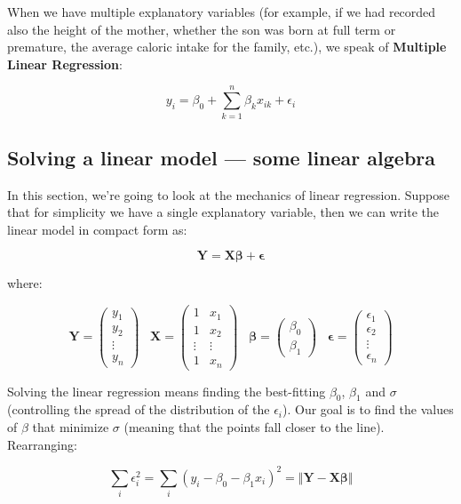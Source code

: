 \documentclass[
  letterpaper,
  DIV=11,
  numbers=noendperiod]{scrreprt}
\begin{document}
When we have multiple explanatory variables (for example, if we had
recorded also the height of the mother, whether the son was born at full
term or premature, the average caloric intake for the family, etc.), we
speak of \textbf{Multiple Linear Regression}:

\[
y_i = \beta_0 + \sum_{k=1}^n \beta_k x_{ik} + \epsilon_i
\]

\subsection{Solving a linear model --- some linear
algebra}\label{solving-a-linear-model-some-linear-algebra}

In this section, we're going to look at the mechanics of linear
regression. Suppose that for simplicity we have a single explanatory
variable, then we can write the linear model in compact form as:

\[
\mathbf{Y} = \mathbf{X} \mathbf{\beta} + \mathbf{\epsilon}
\]

where:

\[
\mathbf{Y} = \begin{pmatrix} y_1\\ y_2\\ \vdots \\ y_n \end{pmatrix} \;\;\; 
\mathbf{X} = \begin{pmatrix} 1 & x_1\\ 1 & x_2\\ \vdots & \vdots \\ 1 & x_n \end{pmatrix}
 \;\;\; 
\mathbf{\beta} = \begin{pmatrix} \beta_0 \\ \beta_1\end{pmatrix} \;\;\; \mathbf{\epsilon} = \begin{pmatrix} \epsilon_1 \\ \epsilon_2 \\ \vdots \\ \epsilon_n \end{pmatrix}
\]

Solving the linear regression means finding the best-fitting
\(\beta_0\), \(\beta_1\) and \(\sigma\) (controlling the spread of the
distribution of the \(\epsilon_i\)). Our goal is to find the values of
\(\beta\) that minimize \(\sigma\) (meaning that the points fall closer
to the line). Rearranging:

\[
\sum_i \epsilon_i^2 = \sum_i (y_i - \beta_0 - \beta_1 x_i)^2 =  \Vert \mathbf{Y} - \mathbf{X} \mathbf{\beta} \Vert
\]
\end{document}
